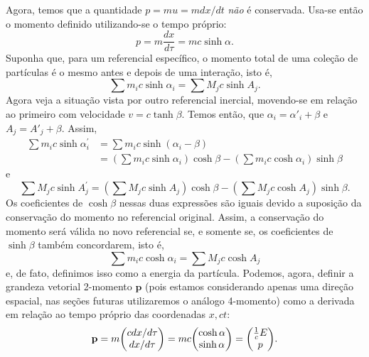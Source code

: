 Agora, temos que a quantidade $p=mu=mdx/dt$ \emph{não} é conservada. Usa-se então o momento definido utilizando-se o tempo próprio:
\[
    p = m\frac{dx}{d\tau}=mc\sinh\alpha.
\]
Suponha que, para um referencial específico, o momento total de uma coleção de partículas é o mesmo antes e depois de uma interação, isto é,
\[
   \sum m_i c\sinh\alpha_i = \sum M_jc\sinh A_j .
\]
Agora veja a situação vista por outro referencial inercial, movendo-se em relação ao primeiro com velocidade $v = c\tanh\beta$. Temos então, que $\alpha_i = \alpha'_i+\beta$ e $A_j = A'_j+\beta$. Assim,
\[
\begin{aligned} \sum m_{i} c \sinh \alpha_{i}^{\prime} &=\sum m_{i} c \sinh \left(\alpha_{i}-\beta\right) \\ &=\left(\sum m_{i} c \sinh \alpha_{i}\right) \cosh \beta-\left(\sum m_{i} c \cosh \alpha_{i}\right) \sinh \beta \end{aligned}  
\]
e
\[
    \sum M_{j} c \sinh A_{j}^{\prime}=\left(\sum M_{j} c \sinh A_{j}\right) \cosh \beta-\left(\sum M_{j} c \cosh A_{j}\right) \sinh \beta   .
\]
Os coeficientes de $\cosh\beta$ nessas duas expressões são iguais devido a suposição da conservação do momento no referencial original. Assim, a conservação do momento será válida no novo referencial se, e somente se, os coeficientes de $\sinh\beta$ também concordarem, isto é, 
\[ \sum m_i c\cosh\alpha_i = \sum M_jc\cosh A_j\]
e, de fato, definimos isso como a energia da partícula.
Podemos, agora, definir a grandeza vetorial 2-momento $\mathbf{p}$ (pois estamos considerando apenas uma direção espacial, nas seções futuras utilizaremos o análogo 4-momento) como a derivada em relação ao tempo próprio das coordenadas $x, ct$:
\begin{equation}
    \mathbf{p}=m \mqty(cdx/d\tau \\ dx/d\tau) = mc\mqty(\cosh\alpha \\ \sinh\alpha) = \mqty( \tfrac{1}{c}E \\ p).
\end{equation}